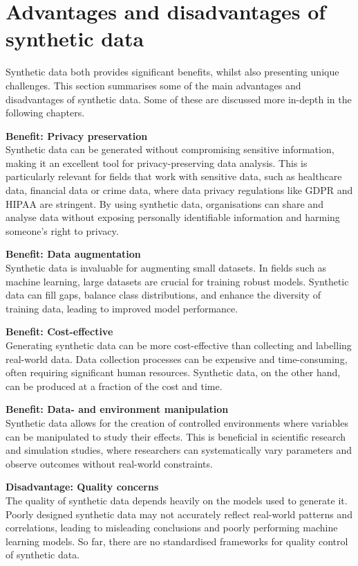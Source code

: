 \section{Advantages and disadvantages of synthetic data}

Synthetic data both provides significant benefits, whilst also presenting unique challenges. This section summarises some of the main advantages and disadvantages of synthetic data. Some of these are discussed more in-depth in the following chapters.

\textbf{Benefit: Privacy preservation}\\
Synthetic data can be generated without compromising sensitive information, making it an excellent tool for privacy-preserving data analysis. This is particularly relevant for fields that work with sensitive data, such as healthcare data, financial data or crime data, where data privacy regulations like GDPR and HIPAA are stringent. By using synthetic data, organisations can share and analyse data without exposing personally identifiable information and harming someone's right to privacy. 

\textbf{Benefit: Data augmentation}\\
Synthetic data is invaluable for augmenting small datasets. In fields such as machine learning, large datasets are crucial for training robust models. Synthetic data can fill gaps, balance class distributions, and enhance the diversity of training data, leading to improved model performance.

\textbf{Benefit: Cost-effective}\\
Generating synthetic data can be more cost-effective than collecting and labelling real-world data. Data collection processes can be expensive and time-consuming, often requiring significant human resources. Synthetic data, on the other hand, can be produced at a fraction of the cost and time.

\textbf{Benefit: Data- and environment manipulation}\\
Synthetic data allows for the creation of controlled environments where variables can be manipulated to study their effects. This is beneficial in scientific research and simulation studies, where researchers can systematically vary parameters and observe outcomes without real-world constraints.  

\textbf{Disadvantage: Quality concerns}\\
The quality of synthetic data depends heavily on the models used to generate it. Poorly designed synthetic data may not accurately reflect real-world patterns and correlations, leading to misleading conclusions and poorly performing machine learning models. So far, there are no standardised frameworks for quality control of synthetic data.

